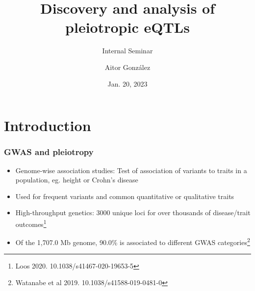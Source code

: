 \documentclass{beamer}
\title{Discovery and analysis of pleiotropic eQTLs}
\subtitle{Internal Seminar}
\author{Aitor Gonz\'alez}
\institute{Aix Marseille Univ, INSERM, TAGC}
\date{Jan. 20, 2023}
\begin{document}
    \begin{frame}

        \titlepage

    \end{frame}

    \section{Introduction} %

    \begin{frame}
        \frametitle{GWAS and pleiotropy}

        \begin{itemize}
            \item Genome-wise association studies: Test of association of variants to traits in a population, eg. height or Crohn's disease
            \item Used for frequent variants and common quantitative or qualitative traits
            \item High-throughput genetics: 3000 unique loci for over thousands of disease/trait outcomes\footnote{Loos 2020. 10.1038/s41467-020-19653-5}
            \item Of the 1,707.0 Mb genome, 90.0\% is associated to different GWAS categories\footnote{Watanabe et al 2019. 10.1038/s41588-019-0481-0}
        \end{itemize}
%


    \end{frame}
\end{document}
